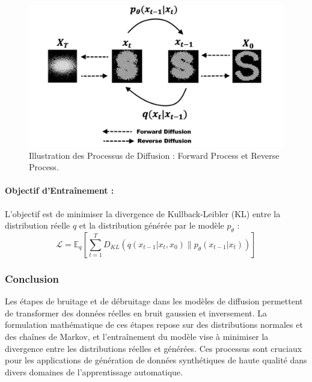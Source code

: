 \begin{figure}[hbt!]
	\centering
	\includegraphics[width=12cm]{images_pfe/diffusion_process.png}
	\caption{Illustration des Processus de Diffusion : Forward Process et Reverse Process.}
	\label{fig:markov}
\end{figure}
\FloatBarrier

\paragraph{Objectif d'Entraînement :}
L'objectif est de minimiser la divergence de Kullback-Leibler (KL) entre la
distribution réelle \( q \) et la distribution générée par le modèle \(
p_\theta \) :
\[
	\mathcal{L} = \mathbb{E}_q \left[ \sum_{t=1}^T D_{KL}(q(x_{t-1} | x_t, x_0) \| p_\theta(x_{t-1} | x_t)) \right]
\]

\subsubsection{Conclusion}

Les étapes de bruitage et de débruitage dans les modèles de diffusion
permettent de transformer des données réelles en bruit gaussien et inversement.
La formulation mathématique de ces étapes repose sur des distributions normales
et des chaînes de Markov, et l'entraînement du modèle vise à minimiser la
divergence entre les distributions réelles et générées. Ces processus sont
cruciaux pour les applications de génération de données synthétiques de haute
qualité dans divers domaines de l'apprentissage automatique.

\newpage

